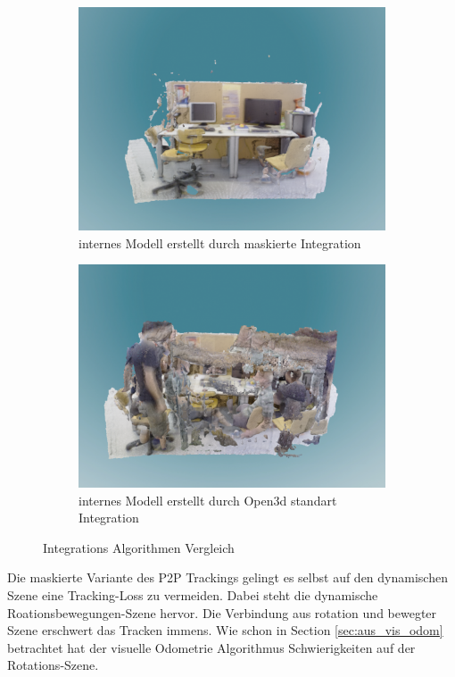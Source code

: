 \documentclass[12pt,DIV=15,BCOR=15mm,twoside,headsepline,abstract=true,listof=totoc,bibliography=totoc]{scrreprt}
\theoremstyle{remark}    %
\begin{document}
\begin{figure}[ht]
        \begin{subfigure}[t]{0.45\textwidth}
            \centering
            \includegraphics[width=\textwidth]{pics/maskout.png}
            \caption{internes Modell erstellt durch maskierte Integration}
            \label{fig:recon_mask}
        \end{subfigure}
        \hfill
        \begin{subfigure}[t]{0.45\textwidth}
            \centering
            \includegraphics[width=\textwidth]{pics/raw.png}
            \caption{internes Modell erstellt durch Open3d standart Integration}
            \label{fig:recon_raw}
        \end{subfigure}
        \caption{Integrations Algorithmen Vergleich}
        \label{fig:bilder_nebeneinander}
    \end{figure}
    Die maskierte Variante des \ac{P2P} Trackings gelingt es selbst auf den dynamischen Szene eine Tracking-Loss zu vermeiden. Dabei steht die dynamische 
    Roationsbewegungen-Szene hervor. Die Verbindung aus rotation und bewegter Szene erschwert das Tracken immens. Wie schon in Section \ref{sec:aus_vis_odom}
    betrachtet hat der visuelle Odometrie Algorithmus Schwierigkeiten auf der Rotations-Szene.
\end{document}
